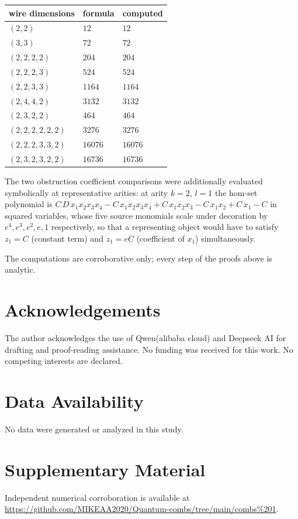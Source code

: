 \documentclass[11pt,a4paper]{article}
\theoremstyle{definition}
\theoremstyle{plain}
\theoremstyle{remark}
\begin{document}
\begin{center}
\begin{tabular}{lll}
wire dimensions & formula & computed \\
\hline
$(2,2)$ & $12$ & $12$\\
$(3,3)$ & $72$ & $72$\\
$(2,2,2,2)$ & $204$ & $204$\\
$(2,2,2,3)$ & $524$ & $524$\\
$(2,2,3,3)$ & $1164$ & $1164$\\
$(2,4,4,2)$ & $3132$ & $3132$\\
$(2,3,2,2)$ & $464$ & $464$\\
$(2,2,2,2,2,2)$ & $3276$ & $3276$\\
$(2,2,2,3,3,2)$ & $16076$ & $16076$\\
$(2,3,2,3,2,2)$ & $16736$ & $16736$
\end{tabular}
\end{center}

The two obstruction coefficient comparisons were additionally evaluated
symbolically at representative arities: at arity $k=2$, $l=1$ the hom-set
polynomial is
$C\,D\,x_1x_2x_3x_4-C\,x_1x_2x_3x_4+C\,x_1x_2x_3-C\,x_1x_2+C\,x_1-C$ in
squared variables, whose five source monomials scale under decoration by
$e^4,e^3,e^2,e,1$ respectively, so that a representing object would have to
satisfy $z_1=C$ (constant term) and $z_1=eC$ (coefficient of $x_1$)
simultaneously.

The computations are corroborative only; every step of the proofs above is
analytic.

\section*{Acknowledgements}
The author acknowledges the use of Qwen(alibaba cloud) and Deepseek AI for drafting and proof-reading assistance. No funding was received for this work. No competing interests are declared.

\section*{Data Availability}
No data were generated or analyzed in this study.

\section*{Supplementary Material}
Independent numerical corroboration is
available at \url{https://github.com/MIKEAA2020/Quantum-combs/tree/main/combs%201}.
\end{document}
